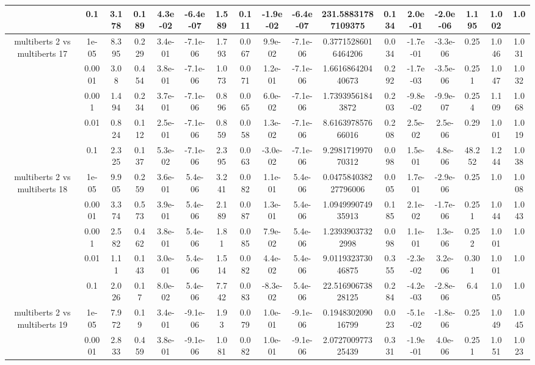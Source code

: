 \begin{tabular}{|c|c|c|c|c|c|c|c|c|c|c|c|c|c|c|c|c|}
 & 0.1 & 3.178 & 0.189 & 4.3e-02 & -6.4e-07 & 1.589 & 0.111 & -1.9e-02 & -6.4e-07 & 231.58831787109375 & 0.134 & 2.0e-01 & -2.0e-06 & 1.195 & 1.002 & 1.0 \\
\hline
\multirow{5}{*}{multiberts 2 vs multiberts 17} & 1e-05 & 8.395 & 0.229 & 3.4e-01 & -7.1e-06 & 1.793 & 0.067 & 9.9e-02 & -7.1e-06 & 0.37715286016464206 & 0.034 & -1.7e-01 & -3.3e-06 & 0.25 & 1.046 & 1.031 \\
 & 0.0001 & 3.08 & 0.454 & 3.8e-01 & -7.1e-06 & 1.073 & 0.071 & 1.2e-01 & -7.1e-06 & 1.661686420440673 & 0.292 & -1.7e-03 & -3.5e-06 & 0.251 & 1.047 & 1.032 \\
 & 0.001 & 1.494 & 0.234 & 3.7e-01 & -7.1e-06 & 0.896 & 0.065 & 6.0e-02 & -7.1e-06 & 1.73939561843872 & 0.203 & -9.8e-02 & -9.9e-07 & 0.254 & 1.109 & 1.068 \\
 & 0.01 & 0.824 & 0.112 & 2.5e-01 & -7.1e-06 & 0.859 & 0.058 & 1.3e-02 & -7.1e-06 & 8.616397857666016 & 0.208 & 2.5e-02 & 2.5e-06 & 0.29 & 1.001 & 1.019 \\
 & 0.1 & 2.325 & 0.137 & 5.3e-02 & -7.1e-06 & 2.395 & 0.063 & -3.0e-02 & -7.1e-06 & 9.298171997070312 & 0.098 & 1.5e-01 & 4.8e-06 & 48.252 & 1.244 & 1.038 \\
\hline
\multirow{5}{*}{multiberts 2 vs multiberts 18} & 1e-05 & 9.905 & 0.259 & 3.6e-01 & 5.4e-06 & 3.241 & 0.082 & 1.1e-01 & 5.4e-06 & 0.047584038227796006 & 0.005 & 1.7e-01 & -2.9e-06 & 0.25 & 1.0 & 1.008 \\
 & 0.0001 & 3.374 & 0.573 & 3.9e-01 & 5.4e-06 & 2.189 & 0.087 & 1.3e-01 & 5.4e-06 & 1.094999074935913 & 0.185 & 2.1e-02 & -1.7e-06 & 0.251 & 1.044 & 1.043 \\
 & 0.001 & 2.582 & 0.462 & 3.8e-01 & 5.4e-06 & 1.81 & 0.085 & 7.9e-02 & 5.4e-06 & 1.23939037322998 & 0.098 & 1.1e-01 & 1.3e-06 & 0.252 & 1.001 & 1.0 \\
 & 0.01 & 1.11 & 0.143 & 3.0e-01 & 5.4e-06 & 1.514 & 0.082 & 4.4e-02 & 5.4e-06 & 9.011932373046875 & 0.355 & -2.3e-02 & 3.2e-06 & 0.301 & 1.001 & 1.0 \\
 & 0.1 & 2.026 & 0.17 & 8.0e-02 & 5.4e-06 & 7.742 & 0.083 & -8.3e-02 & 5.4e-06 & 22.51690673828125 & 0.284 & -4.2e-03 & -2.8e-06 & 6.4 & 1.005 & 1.0 \\
\hline
\multirow{5}{*}{multiberts 2 vs multiberts 19} & 1e-05 & 7.972 & 0.19 & 3.4e-01 & -9.1e-06 & 1.93 & 0.079 & 1.0e-01 & -9.1e-06 & 0.194830209016799 & 0.023 & -5.1e-02 & -1.8e-06 & 0.25 & 1.049 & 1.045 \\
 & 0.0001 & 2.833 & 0.459 & 3.8e-01 & -9.1e-06 & 1.081 & 0.082 & 1.0e-01 & -9.1e-06 & 2.072700977325439 & 0.331 & -1.9e-01 & 4.0e-06 & 0.251 & 1.051 & 1.023 \\

\end{tabular}
